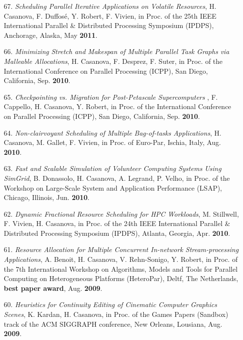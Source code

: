 \begin{enumerate}
\item[67.] {\it Scheduling Parallel Iterative Applications on Volatile
Resources}, H. Casanova, F. Duffos\'e, Y. Robert, F. Vivien, in
Proc. of the 25th  IEEE International Parallel \& Distributed
Processing Symposium (IPDPS), Anchorage, Alaska, May {\bf 2011}.

\item[66.] {\it Minimizing Stretch and Makespan of Multiple Parallel Task Graphs via Malleable Allocations},  H. Casanova, F. Desprez, F. Suter, 
in Proc. of the International
Conference on Parallel Processing (ICPP), San Diego, California, Sep.
{\bf 2010}. 

\item[65.] {\it Checkpointing vs. Migration for Post-Petascale Supercomputers
}, F. Cappello, H. Casanova, Y. Robert, 
in Proc. of the International
Conference on Parallel Processing (ICPP), San Diego, California, Sep.
{\bf 2010}. 



\item[64.] {\it Non-clairvoyant Scheduling of Multiple Bag-of-tasks
Applications}, H. Casanova, M. Gallet, F. Vivien, in Proc. of  Euro-Par,
Ischia, Italy, Aug. {\bf 2010}.


\item[63.] {\it Fast and Scalable Simulation of Volunteer Computing
Systems Using SimGrid}, B. Donassolo, H. Casanova, A. Legrand, P.
Velho, in Proc. of the Workshop on Large-Scale System and
Application Performance (LSAP), Chicago, Illinois, Jun. {\bf 2010}.

\item[62.] {\it Dynamic Fractional Resource Scheduling for HPC
Workloads}, M. Stillwell, F. Vivien, H. Casanova, in Proc. of the
24th  IEEE International Parallel \& Distributed Processing Symposium (IPDPS),
Atlanta, Georgia, Apr. {\bf 2010}.

\item[61.] {\it Resource Allocation for Multiple Concurrent In-network Stream-processing Applications}, A. Benoit, H. Casanova, V. Rehn-Sonigo, Y. Robert,
in Proc. of the 7th International Workshop on Algorithms,
Models and Tools for Parallel Computing on Heterogeneous Platforms 
(HeteroPar), Deltf, The Netherlands, {\bf best paper award},
Aug. {\bf 2009}. 

\item[60.] {\it Heuristics for Continuity Editing of Cinematic Computer
Graphics Scenes}, K. Kardan, H. Casanova, in Proc. of the Games
Papers (Sandbox) track of the ACM SIGGRAPH conference, New Orleans,
Lousiana, Aug. {\bf 2009}.


\end{enumerate}
